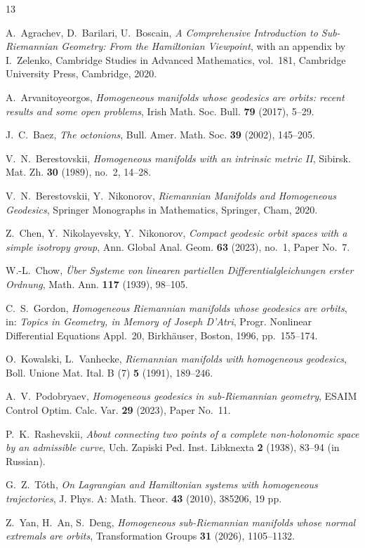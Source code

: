 \begin{thebibliography}{13}

 A.~Agrachev, D.~Barilari, U.~Boscain,
\emph{A Comprehensive Introduction to Sub-Riemannian Geometry: From the Hamiltonian Viewpoint},
with an appendix by I.~Zelenko, Cambridge Studies in Advanced Mathematics, vol.~181, Cambridge
University Press, Cambridge, 2020.

 A.~Arvanitoyeorgos,
\emph{Homogeneous manifolds whose geodesics are orbits: recent results and some open problems},
Irish Math. Soc. Bull. \textbf{79} (2017), 5--29.

 J.~C.~Baez, \emph{The octonions}, Bull. Amer. Math. Soc. \textbf{39} (2002),
145--205.

 V.~N.~Berestovskii,
\emph{Homogeneous manifolds with an intrinsic metric II}, Sibirsk. Mat. Zh. \textbf{30} (1989),
no.~2, 14--28.

 V.~N.~Berestovskii, Y.~Nikonorov,
\emph{Riemannian Manifolds and Homogeneous Geodesics}, Springer Monographs in Mathematics,
Springer, Cham, 2020.

 Z.~Chen, Y.~Nikolayevsky, Y.~Nikonorov,
\emph{Compact geodesic orbit spaces with a simple isotropy group}, Ann. Global Anal. Geom.
\textbf{63} (2023), no.~1, Paper No.~7.

 W.-L.~Chow,
\emph{\"Uber Systeme von linearen partiellen Differentialgleichungen erster Ordnung}, Math. Ann.
\textbf{117} (1939), 98--105.

 C.~S.~Gordon,
\emph{Homogeneous Riemannian manifolds whose geodesics are orbits}, in: \emph{Topics in Geometry,
in Memory of Joseph D'Atri}, Progr. Nonlinear Differential Equations Appl.~20, Birkh\"auser,
Boston, 1996, pp.~155--174.

 O.~Kowalski, L.~Vanhecke,
\emph{Riemannian manifolds with homogeneous geodesics}, Boll. Unione Mat. Ital. B (7)
\textbf{5} (1991), 189--246.

 A.~V.~Podobryaev,
\emph{Homogeneous geodesics in sub-Riemannian geometry}, ESAIM Control Optim. Calc. Var.
\textbf{29} (2023), Paper No.~11.

 P.~K.~Rashevskii,
\emph{About connecting two points of a complete non-holonomic space by an admissible curve},
Uch. Zapiski Ped. Inst. Libknexta \textbf{2} (1938), 83--94 (in Russian).

 G.~Z.~T\'oth,
\emph{On Lagrangian and Hamiltonian systems with homogeneous trajectories}, J. Phys. A: Math.
Theor. \textbf{43} (2010), 385206, 19 pp.

 Z.~Yan, H.~An, S.~Deng,
\emph{Homogeneous sub-Riemannian manifolds whose normal extremals are orbits}, Transformation
Groups \textbf{31} (2026), 1105--1132.

\end{thebibliography}

